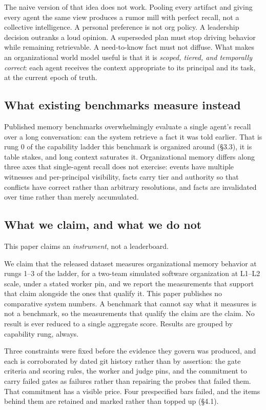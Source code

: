 \documentclass[11pt]{article}
\begin{document}
The naive version of that idea does not work. Pooling every artifact and giving
every agent the same view produces a rumor mill with perfect recall, not a
collective intelligence. A personal preference is not org policy. A leadership
decision outranks a loud opinion. A superseded plan must stop driving behavior
while remaining retrievable. A need-to-know fact must not diffuse. What makes an
organizational world model useful is that it is \emph{scoped, tiered, and
temporally correct}: each agent receives the context appropriate to its principal
and its task, at the current epoch of truth.

\subsection{What existing benchmarks measure instead}

Published memory benchmarks overwhelmingly evaluate a single agent's recall over
a long conversation: can the system retrieve a fact it was told earlier. That is
rung 0 of the capability ladder this benchmark is organized around (\S3.3), it is
table stakes, and long context saturates it. Organizational memory differs along
three axes that single-agent recall does not exercise: events have multiple
witnesses and per-principal visibility, facts carry tier and authority so that
conflicts have correct rather than arbitrary resolutions, and facts are
invalidated over time rather than merely accumulated.

\subsection{What we claim, and what we do not}

This paper claims an \emph{instrument}, not a leaderboard.

We claim that the released dataset measures organizational memory behavior at
rungs 1--3 of the ladder, for a two-team simulated software organization at
L1--L2 scale, under a stated worker pin, and we report the measurements that
support that claim alongside the ones that qualify it. This paper publishes
no comparative system numbers. A benchmark that cannot say what it measures is
not a benchmark, so the measurements that qualify the claim are the claim. No
result is ever reduced to a single aggregate score. Results are grouped by
capability rung, always.

Three constraints were fixed before the evidence they govern was produced, and
each is corroborated by dated git history rather than by assertion: the gate
criteria and scoring rules, the worker and judge pins, and the commitment to
carry failed gates as failures rather than repairing the probes that failed them.
That commitment has a visible price. Four prespecified bars failed, and the
items behind them are retained and marked rather than topped up (\S4.1).
\end{document}
